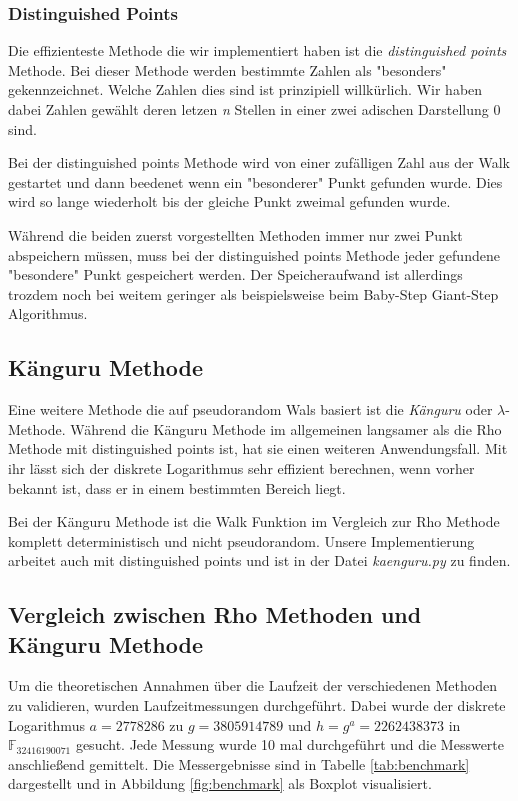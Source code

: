 \documentclass{scrartcl}
\begin{document}
\subsubsection{Distinguished Points}
\label{sec:distinguished_points}
Die effizienteste Methode die wir implementiert haben ist die
\emph{distinguished points} Methode.
Bei dieser Methode werden bestimmte Zahlen als "besonders" gekennzeichnet.
Welche Zahlen dies sind ist prinzipiell willkürlich.
Wir haben dabei Zahlen gewählt deren letzen \emph{n} Stellen in einer
zwei adischen Darstellung 0 sind.

Bei der distinguished points Methode wird von einer zufälligen Zahl aus
der Walk gestartet und dann beedenet wenn ein "besonderer" Punkt
gefunden wurde.
Dies wird so lange wiederholt bis der gleiche Punkt zweimal gefunden wurde.

Während die beiden zuerst vorgestellten Methoden immer nur zwei Punkt abspeichern müssen,
muss bei der distinguished points Methode jeder gefundene "besondere" Punkt gespeichert werden.
Der Speicheraufwand ist allerdings trozdem noch bei weitem geringer als beispielsweise beim
Baby-Step Giant-Step Algorithmus.
\cite{VanOorschot1999}

\subsection{Känguru Methode}
\label{sec:kaenguru}
Eine weitere Methode die auf pseudorandom Wals basiert ist die
\emph{Känguru} oder \(\lambda\)-Methode.
Während die Känguru Methode im allgemeinen langsamer als die Rho
Methode mit distinguished points ist, hat sie einen weiteren Anwendungsfall.
Mit ihr lässt sich der diskrete Logarithmus sehr effizient berechnen,
wenn vorher bekannt ist, dass er in einem bestimmten Bereich liegt.

Bei der Känguru Methode ist die Walk Funktion im Vergleich zur Rho Methode
komplett deterministisch und nicht pseudorandom.
Unsere Implementierung arbeitet auch mit distinguished points und ist in
der Datei \emph{kaenguru.py} zu finden.
\cite{Galbraith2012}

\subsection{Vergleich zwischen Rho Methoden und Känguru Methode}
Um die theoretischen Annahmen über die Laufzeit der verschiedenen Methoden
zu validieren, wurden Laufzeitmessungen durchgeführt.
Dabei wurde der diskrete Logarithmus \( a = 2778286 \) zu \( g = 3805914789 \)
und \(h = g^a = 2262438373 \) in \( \mathbb{F}_{32416190071} \) gesucht.
Jede Messung wurde 10 mal durchgeführt und die Messwerte anschließend gemittelt.
Die Messergebnisse sind in Tabelle \ref{tab:benchmark} dargestellt und
in Abbildung \ref{fig:benchmark} als Boxplot visualisiert.
\end{document}
